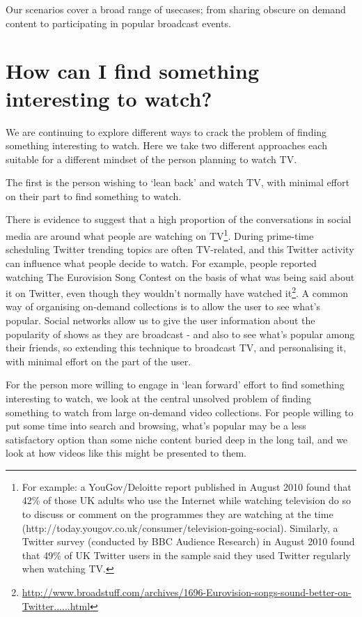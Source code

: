\documentclass{notube}
\begin{document}
Our scenarios cover a broad range of usecases; from sharing obscure on demand content to participating in popular broadcast events.

\section{How can I find something interesting to watch?}

We are continuing to explore different ways to crack the problem of finding something interesting to watch. Here we take two different approaches each suitable for a different mindset of the person planning to watch TV. 

The first is the person wishing to `lean back' and watch TV, with minimal effort on their part to find something to watch. 

There is evidence to suggest that a high proportion of the conversations in social media are around what people are watching on TV\footnote{For example: a YouGov/Deloitte report published in August 2010 found that 42\% of those UK adults who use the Internet while watching television do so to discuss or comment on the programmes they are watching at the time (http://today.yougov.co.uk/consumer/television-going-social). Similarly, a Twitter survey (conducted by BBC Audience Research) in August 2010 found that 49\% of UK Twitter users in the sample said they used Twitter regularly when watching TV.}. During prime-time scheduling Twitter trending topics are often TV-related, and this Twitter activity can influence what people decide to watch. For example, people reported watching The Eurovision Song Contest on the basis of what was being said about it on Twitter, even though they wouldn't normally have watched it\footnote{\url{http://www.broadstuff.com/archives/1696-Eurovision-songs-sound-better-on-Twitter......html}}. A common way of organising on-demand collections is to allow the user to see what's popular. Social networks allow us to give the user information about the popularity of shows as they are broadcast - and also to see what's popular among their friends, so extending this technique to broadcast TV, and personalising it, with minimal effort on the part of the user.


For the person more willing to engage in `lean forward' effort to find something interesting to watch, we look at the central unsolved problem of finding something to watch from large on-demand video collections. For people willing to put some time into search and browsing, what's popular may be a less satisfactory option than some niche content buried deep in the long tail, and we look at how videos like this might be presented to them.
\end{document}
